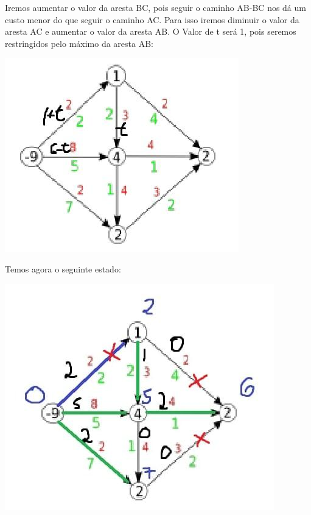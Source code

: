\documentclass[11pt]{article}
\begin{document}
\newpage
Iremos aumentar o valor da aresta BC, pois seguir o caminho AB-BC nos dá um custo menor do que seguir o caminho AC. Para isso iremos diminuir o valor da aresta AC e aumentar o valor da aresta AB. O Valor de t será 1, pois seremos restringidos pelo máximo da aresta AB:
\begin{center}
\includegraphics[width=.9\linewidth]{12.jpg}
\end{center}

\newpage
Temos agora o seguinte estado:
\begin{center}
\includegraphics[width=.9\linewidth]{13.jpg}
\end{center}
\end{document}
